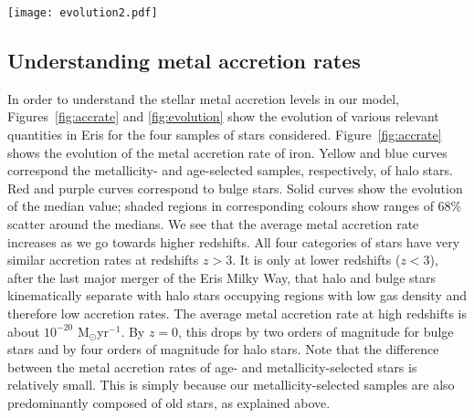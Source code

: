 \documentclass[a4paper,fleqn,usenatbib]{mnras}
\begin{document}
\begin{figure*}
  \texttt{[image: evolution2.pdf]}
  \caption{Evolution of various quantities in Eris: (a) gas density;
    (b) radial distance of stars from centres of mass of respective
    host halos; (c) stellar relative velocity with respect to the gas;
    (d) gas sound speed; (e) gas iron abundance [Fe/H]; (e) gas oxygen
    abundance [O/H].  Gas densities, sound speed, and metal abundances
    refer to gas along stellar orbits.  In each panel, solid curves
    show median quantities and shaded regions show 68\% scatter around
    the median.  Blue and yellow curves and shaded regions describe
    properties of halo stars selected by age and metallicity,
    respectively.  Bulge stars selected by age and metallicity are
    described, respectively, by purple and red curves.  In panel (a),
    the black curve shows the average gas density within the virial
    radius.  Brown dot-dashed, dashed, and solid curves in this panel
    show evolution of density averaged within 25, 2, and 0.5 pkpc from
    the centres of mass of progenitor haloes of the Eris Milky Way.
    In panel (c), the brown dashed curve shows the evolution of the
    circular velocity $v_\mathrm{circ}$ at the virial radius.  The
    black dashed curve in this panel shows the evolution of the
    maximum rotational velocity $v_\mathrm{max}$.  Densities and
    velocities are in physical units.  }
  \label{fig:evolution}
\end{figure*}

\subsection{Understanding metal accretion rates}

In order to understand the stellar metal accretion levels in our
model, Figures~\ref{fig:accrate} and \ref{fig:evolution} show the
evolution of various relevant quantities in Eris for the four samples
of stars considered.  Figure~\ref{fig:accrate} shows the evolution of
the metal accretion rate of iron.  Yellow and blue curves correspond
the metallicity- and age-selected samples, respectively, of halo
stars.  Red and purple curves correspond to bulge stars.  Solid curves
show the evolution of the median value; shaded regions in
corresponding colours show ranges of 68\% scatter around the medians.
We see that the average metal accretion rate increases as we go
towards higher redshifts.  All four categories of stars have very
similar accretion rates at redshifts $z>3$.  It is only at lower
redshifts ($z<3$), after the last major merger of the Eris Milky Way,
that halo and bulge stars kinematically separate with halo stars
occupying regions with low gas density and therefore low accretion
rates.  The average metal accretion rate at high redshifts is about
$10^{-20}$ M$_\odot$yr$^{-1}$.  By $z=0$, this drops by two orders of
magnitude for bulge stars and by four orders of magnitude for halo
stars.  Note that the difference between the metal accretion rates of
age- and metallicity-selected stars is relatively small.  This is
simply because our metallicity-selected samples are also predominantly
composed of old stars, as explained above.
\end{document}
